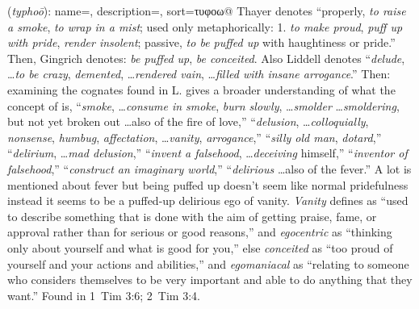 \item[Egomaniacal,]

(\textit{typhoō}):
{
    name=,
    description={},
    sort=τυφοω@
}
Thayer denotes ``properly, \emph{to raise a smoke}, \emph{to wrap in a mist}; used only metaphorically:  1. \emph{to make proud}, \emph{puff up with pride}, \emph{render insolent}; passive, \emph{to be puffed up} with haughtiness or pride.'' Then, Gingrich denotes: \emph{be puffed up}, \emph{be conceited}. 
Also Liddell denotes  ``\emph{delude}, \ldots \emph{to be crazy}, \emph{demented}, \ldots \emph{rendered vain}, \ldots \emph{filled with insane arrogance}.''
Then: examining the cognates found in L. gives a broader understanding of what the concept of  is, 
 ``\emph{smoke}, \ldots \emph{consume in smoke}, \emph{burn slowly}, \ldots \emph{smolder} \ldots \emph{smoldering}, but not yet broken out \ldots also of the fire of love,''
 ``\emph{delusion}, \ldots \emph{colloquially}, \emph{nonsense}, \emph{humbug}, \emph{affectation}, \ldots \emph{vanity}, \emph{arrogance},''
 ``\emph{silly old man}, \emph{dotard},''
 ``\emph{delirium}, \ldots \emph{mad delusion},''
 ``\emph{invent a falsehood}, \ldots \emph{deceiving} himself,'' 
 ``\emph{inventor of falsehood},'' 
 ``\emph{construct an imaginary world},'' 
 ``\emph{delirious} \ldots also of the fever.'' 
A lot is mentioned about fever but being puffed up doesn't seem like normal pridefulness instead it seems to be a puffed-up delirious ego of vanity. \emph{Vanity} defines as ``used to describe something that is done with the aim of getting praise, fame, or approval rather than for serious or good reasons,'' and \emph{egocentric} as ``thinking only about yourself and what is good for you,'' else \emph{conceited} as ``too proud of yourself and your actions and abilities,'' and \emph{egomaniacal} as ``relating to someone who considers themselves to be very important and able to do anything that they want.''
Found in 1~Tim 3:6; 2~Tim 3:4.
